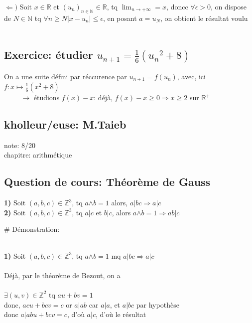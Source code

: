 \documentclass{article}
\begin{document}
$\Leftarrow )$ Soit $x \in \mathbb{R}$ et $\left(u_n \right)_{n \in \mathbb{N}} \in \mathbb{R}$, tq $\lim_{n \rightarrow + \infty} = x$, doncc $\forall \epsilon > 0$, on dispose de $N \in \mathbb{N}$ tq $\forall n \geqslant N |x-u_n| \leqslant \epsilon$, en posant $a = u_N$, on obtient le résultat voulu \\ \\

\subsection{Exercice: étudier $u_{n+1} = \frac{1}{6} \left({u_n}^2 + 8 \right)$ }
\vspace{0.4cm}

On a une suite défini par réccurence par $u_{n+1} = f( u_n )$, avec, ici $f: x \mapsto \frac{1}{6} \left(x^2 + 8 \right)$ \\

$\hspace{1cm} \rightarrow$ étudions $f(x) - x$: déjà, $f(x) - x \geqslant 0 \Rightarrow x \geqslant 2$ sur $\mathbb{R}^+$

\subsection{kholleur/euse: M.Taieb}

note: 8/20 \\
chapitre: arithmétique

\subsection{Question de cours: Théorème de Gauss}

\textbf{1)} Soit $(a,b,c) \in \mathbb{Z}^3$, tq $a${\fontsize{1}{1}\selectfont $\land$}$b = 1$ alors, $a | bc \Rightarrow a | c$\\
\textbf{2)} Soit $(a,b,c) \in \mathbb{Z}^3$, tq $a|c$ et $b|c$, alors $a${\fontsize{1}{1}\selectfont $\land$}$b = 1 \Rightarrow ab | c$

\vspace{0.4cm}
$\#$ Démonstration: \\ \\
\vspace{0.2cm}

\textbf{1)} Soit $(a,b,c) \in \mathbb{Z}^3$, tq $a${\fontsize{1}{1}\selectfont $\land$}$b = 1$ mq $a | bc \Rightarrow a | c$\\ \\
Déjà, par le théorème de Bezout, on a \\ \\
$\exists (u,v) \in \mathbb{Z}^2$ tq $au + bv = 1 $ \\
donc, $acu + bcv = c$ or $a|ab$ car $a|a$, et $a|bc$ par hypothèse \\
donc $a|abu + bcv = c$, d'où $a|c$, d'où le résultat \\ \\
\end{document}
